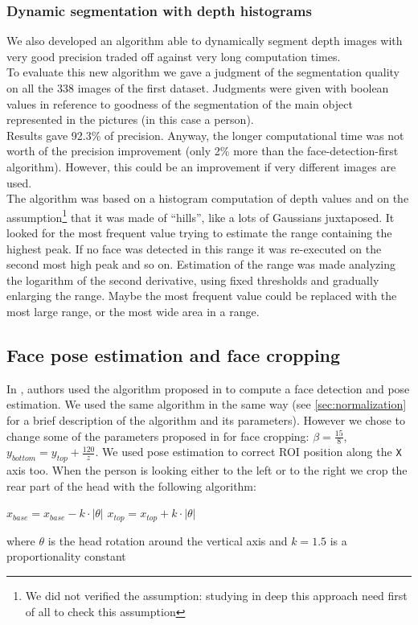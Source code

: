 \documentclass{article}
\begin{document}
\subsubsection{Dynamic segmentation with depth histograms}
We also developed an algorithm able to dynamically segment depth images with very good precision traded off against very long computation times. \\
To evaluate this new algorithm we gave a judgment of the segmentation quality on all the 338 images of the first dataset. Judgments were given with boolean values in reference to goodness of the segmentation of the main object represented in the pictures (in this case a person).	\\
Results gave 92.3\% of precision. Anyway, the longer computational time was not worth of the precision improvement (only 2\% more than the face-detection-first algorithm). However, this could be an improvement if very different images are used. \\
The algorithm was based on a histogram computation of depth values and on the
assumption\footnote{We did not verified the assumption: studying in deep
this approach need first of all to check this assumption} that it was made of
``hills'', like a lots of Gaussians juxtaposed.
It looked for the most frequent value trying to estimate the range containing
the highest peak. If no face was detected in this range it was re-executed on
the second most high peak and so on. Estimation of the range was made
analyzing the logarithm of the second derivative, using fixed thresholds and
gradually enlarging the range. Maybe the most frequent value could be replaced
with the most large range, or the most wide area in a range.

\subsection{Face pose estimation and face cropping}	\label{sec:cropping}
In \citet{Hayat2016}, authors used the algorithm proposed in \citet{Fanelli2011} to compute a face detection and pose estimation. We used the same algorithm in the same way (see \ref{sec:normalization} for a brief description of the algorithm and its parameters). However we chose to change some of the parameters proposed in \citet{Hayat2016} for face cropping: $\beta = \frac{15}{8}$, $y_{bottom} = y_{top} + \frac{120}{z}$. We used pose estimation to correct ROI position along the \verb|X| axis too. When the person is looking either to the left or to the right we crop the rear part of the head with the following algorithm:
\begin{algorithm}
	\begin{algorithmic}[1]
		\State $x_{base} = x_{base} - k \cdot |\theta|$
		\Else
		\State $x_{top} = x_{top} + k \cdot |\theta|$
		\EndIf
	\end{algorithmic}
\end{algorithm}
where $\theta$ is the head rotation around the vertical axis and $k = 1.5$ is a proportionality constant
\end{document}
